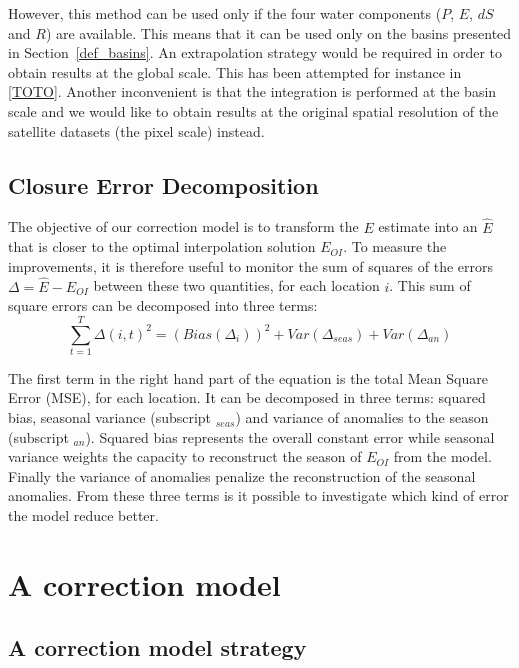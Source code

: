 \documentclass[draft]{agujournal2019}
\begin{document}
However, this method can be used only if the four water components ($P$, $E$, $dS$ and $R$) are available. 
This means that it can be used only on the basins presented in Section~\ref{def_basins}. 
An extrapolation strategy would be required in order to obtain results at the global scale. 
This has been attempted for instance in \ref{TOTO}. 
Another inconvenient is that the integration is performed at the basin scale and 
we would like to obtain results at the original spatial resolution of the satellite datasets (the pixel scale) instead.

\subsection{Closure Error Decomposition}

The objective of our correction model is to transform the $E$ estimate into an $\hat E$ that is closer to the optimal interpolation solution $E_{OI}$. To measure the improvements, it is therefore useful to monitor the sum of squares of the errors $\Delta = \hat E - E_{OI}$ between these two quantities, for each location $i$.
This sum of square errors can be decomposed into three terms:
\begin{equation}
\sum_{t=1}^T {\Delta(i,t)}^2 =  \left(Bias\left(\Delta_i  \right) \right)^2 + Var\left( \Delta_{seas} \right) + Var\left( \Delta_{an} \right)
\end{equation}

The first term in the right hand part of the equation is the total Mean Square Error (MSE), for each location. 
It can be decomposed in three terms: squared bias, seasonal variance (subscript $_{seas}$) and variance of anomalies to the season (subscript $_{an}$).
 Squared bias represents the overall constant error while seasonal variance weights the capacity to reconstruct the season of $E_{OI}$ from the model. 
Finally the variance of anomalies penalize the reconstruction of the seasonal anomalies. 
From these three terms is it possible to investigate which kind of error the model reduce better.

\section{A correction model}

\subsection{A correction model strategy}
\end{document}
